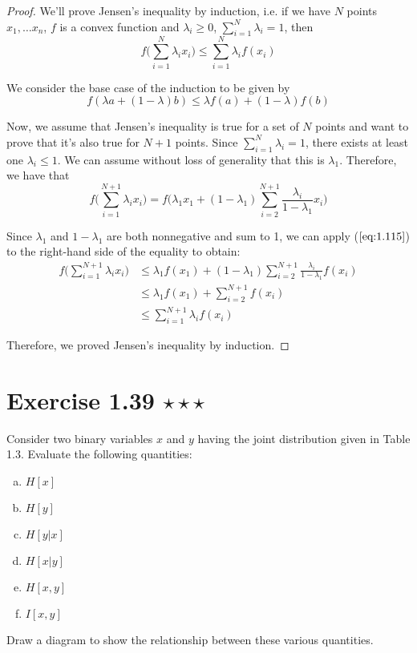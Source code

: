 \begin{proof}
    We'll prove Jensen's inequality by induction, i.e.
    if we have $N$ points $x_1, \ldots x_n$, $f$ is a convex function and $\lambda_i \geq 0$, 
    $\displaystyle \sum_{i=1}^{N} \lambda_i = 1$, then
    \begin{equation*}
        f\bigg(\sum_{i=1}^{N} \lambda_i x_i\bigg) \leq \sum_{i=1}^{N} \lambda_i f(x_i)
        \tag{1.115}\label{eq:1.115}
    \end{equation*}

    We consider the base case of the induction to be given by
    \begin{equation*}
        f(\lambda a + (1 - \lambda)b) \leq \lambda f(a) + (1 - \lambda) f(b)
        \tag{1.114}\label{eq:1.114}
    \end{equation*}

    Now, we assume that Jensen's inequality is true for a
    set of $N$ points and want to prove that it's also true for
    $N + 1$ points. Since $\displaystyle \sum_{i=1}^{N} \lambda_i = 1$,
    there exists at least one $\lambda_i \leq 1$. We can assume
    without loss of generality that this is $\lambda_1$.
    Therefore, we have that
    \[
        f\bigg(\sum_{i=1}^{N+1} \lambda_i x_i\bigg)
        = f\bigg(\lambda_1 x_1 + (1 - \lambda_1) \sum_{i=2}^{N+1} \frac{\lambda_i}{1 - \lambda_1} x_i\bigg)
    \] 

    Since $\lambda_1$ and $1 - \lambda_1$ are both nonnegative and sum to 1,
    we can apply ($\ref{eq:1.115}$) to the right-hand side of the equality to obtain:
    \begin{align*}
        f\bigg(\sum_{i=1}^{N+1} \lambda_i x_i\bigg)
        &\leq \lambda_1 f(x_1) + (1 - \lambda_1) \sum_{i=2}^{N+1} \frac{\lambda_i}{1 - \lambda_1} f(x_i) \\
        &\leq \lambda_1 f(x_1) + \sum_{i=2}^{N+1} f(x_i) \\
        &\leq \sum_{i=1}^{N+1} \lambda_i f(x_i) \tag{1.115}
    \end{align*}

    Therefore, we proved Jensen's inequality by induction.
\end{proof}

\section*{Exercise 1.39 $\star \star \star$}
Consider two binary variables $x$ and $y$ having the joint distribution
given in Table 1.3. Evaluate the following quantities:
\begin{multicols}{3}
    \begin{enumerate}[(a)]
        \item $H[x]$
        \item $H[y]$
        \item $H[y | x]$
        \item $H[x | y]$
        \item $H[x, y]$
        \item $I[x, y]$
    \end{enumerate}
\end{multicols}
Draw a diagram to show the relationship between these various quantities.

